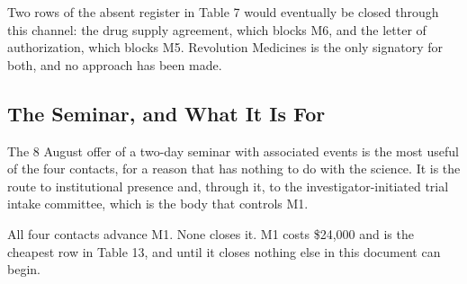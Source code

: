 Two rows of the absent register in Table 7 would eventually be closed through
this channel: the drug supply agreement, which blocks M6, and the letter of
authorization, which blocks M5. Revolution Medicines is the only signatory for
both, and no approach has been made.

\subsection{The Seminar, and What It Is For}

The 8 August offer of a two-day seminar with associated events is the most
useful of the four contacts, for a reason that has nothing to do with the
science. It is the route to institutional presence and, through it, to the
investigator-initiated trial intake committee, which is the body that controls
M1.

All four contacts advance M1. None closes it. M1 costs \$24,000 and is the
cheapest row in Table 13, and until it closes nothing else in this document can
begin.
